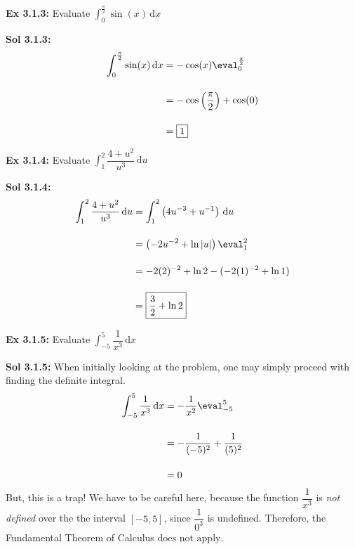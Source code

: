 \begin{tcolorbox}[example]
    \textbf{Ex 3.1.3: } Evaluate $\int_0^{\frac{\pi}{2}} \sin (x) \,\mathrm{d}x$
\end{tcolorbox} 
\begin{tcolorbox}[solution]
    \textbf{Sol 3.1.3: } \begin{align*}
        \int_0^{\frac{\pi}{2}} \sin (x) \,\mathrm{d}x &= -\cos (x) \eval_0^{\frac{\pi}{2}} \\[11pt]
        & = -\cos \left(\dfrac{\pi}{2}\right) + \cos(0) \\[11pt]
        & = \boxed{1}
    \end{align*}
\end{tcolorbox} \vspace{11pt}

\begin{tcolorbox}[example]
    \textbf{Ex 3.1.4: } Evaluate $\int_1^2 \dfrac{4 + u^2}{u^3} \,\mathrm{d}u$
\end{tcolorbox}
\begin{tcolorbox}[solution]
    \textbf{Sol 3.1.4: } \begin{align*}
        \int_1^2 \dfrac{4 + u^2}{u^3} \,\mathrm{d}u &= \int_1^2 \left(4u^{-3} + u^{-1}\right) \,\mathrm{d}u \\[11pt]
        & = \left(-2u^{-2} + \ln |u|\right) \eval_1^2 \\[11pt]
        & = -2(2)^{-2} + \ln 2 - (-2(1)^{-2} + \ln 1) \\[11pt]
        & = \boxed{\dfrac{3}{2} + \ln 2}
    \end{align*}
\end{tcolorbox} \vspace{11pt}

\begin{tcolorbox}[example]
    \textbf{Ex 3.1.5: } Evaluate $\int_{-5}^5 \dfrac{1}{x^3} \,\mathrm{d}x$
\end{tcolorbox}
\begin{tcolorbox}[solution]
    \textbf{Sol 3.1.5: } When initially looking at the problem, one may simply proceed with finding the definite integral. \begin{align*}
        \int_{-5}^5 \dfrac{1}{x^3} \,\mathrm{d}x & = -\dfrac{1}{x^2} \eval_{-5}^5 \\[11pt]
        & = -\dfrac{1}{(-5)^2} + \dfrac{1}{(5)^2} \\[11pt]
        & = 0
    \end{align*}
    But, this is a trap! We have to be careful here, because the function $\dfrac{1}{x^3}$ is \textit{not defined} over the the interval $[-5, 5]$, since $\dfrac{1}{0^3}$ is undefined. Therefore, the Fundamental Theorem of Calculus $\boxed{\text{does not apply}}$.
\end{tcolorbox}

